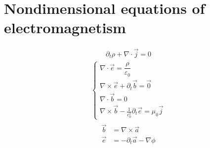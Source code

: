 \documentclass[letterpaper,10pt,english]{jupyterBook}
\begin{document}
\sphinxstepscope


\section{Non\sphinxhyphen{}dimensional equations of electromagnetism}
\label{\detokenize{ch/regimes-non-dimensional:non-dimensional-equations-of-electromagnetism}}\label{\detokenize{ch/regimes-non-dimensional:classical-electromagnetism-regimes-non-dimensional}}\label{\detokenize{ch/regimes-non-dimensional::doc}}
\sphinxAtStartPar
{}
\begin{equation*}
\begin{split}\partial_t \rho + \nabla \cdot \vec{j} = 0\end{split}
\end{equation*}
\sphinxAtStartPar
{}
\begin{equation*}
\begin{split}\begin{cases}
    \nabla \cdot \vec{e} = \dfrac{\rho}{\varepsilon_0} \\
    \nabla \times \vec{e} + \partial_t \vec{b} = \vec{0} \\ 
    \nabla \cdot \vec{b} = 0 \\
    \nabla \times \vec{b} - \frac{1}{c_0^2} \partial_t \vec{e} = \mu_0 \vec{j} 
  \end{cases}\end{split}
\end{equation*}
\sphinxAtStartPar
{}
\begin{equation*}
\begin{split}\begin{aligned}
      \vec{b} & = \nabla \times \vec{a} \\
      \vec{e} & = -\partial_t \vec{a} - \nabla \phi \\
   \end{aligned}\end{split}
\end{equation*}
\sphinxAtStartPar
{}
\end{document}
